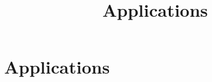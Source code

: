 \ifx\inthesis\undefined %

\title{Applications}

\maketitle
\else %
\chapter{Applications}
\label{cha:Applications}
\fi %


\ifx\inthesis\undefined
\printbibliography
\else\relax\fi
